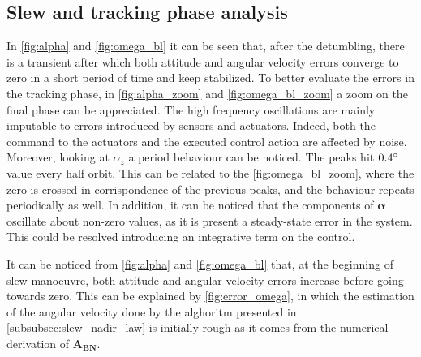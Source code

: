 \subsection{Slew and tracking phase analysis}
\label{subsec:slew_analysis}



In \autoref{fig:alpha} and \autoref{fig:omega_bl} it can be seen that, after the detumbling, there is a transient after which both attitude and angular velocity errors converge to zero in a short period of time and keep stabilized.
To better evaluate the errors in the tracking phase, in \autoref{fig:alpha_zoom} and \autoref{fig:omega_bl_zoom} a zoom on the final phase can be appreciated. The high frequency oscillations are mainly imputable to errors introduced by sensors and actuators. Indeed, both the command to the actuators and the executed control action are affected by noise.
Moreover, looking at $\alpha_z$ a period behaviour can be noticed. The peaks hit $0.4 \degree$ value every half orbit. This can be related to the \autoref{fig:omega_bl_zoom}, where the zero is crossed in corrispondence of the previous peaks, and the behaviour repeats periodically as well.
In addition, it can be noticed that the components of $\boldsymbol{\alpha}$ oscillate about non-zero values, as it is present a steady-state error in the system. This could be resolved introducing an integrative term on the control.

It can be noticed from \autoref{fig:alpha} and \autoref{fig:omega_bl} that, at the beginning of slew manoeuvre, both attitude and angular velocity errors increase before going towards zero. This can be explained by \autoref{fig:error_omega}, in which the estimation of the angular velocity done by the alghoritm presented in \autoref{subsubsec:slew_nadir_law} is initially rough as it comes from the numerical derivation of $\boldsymbol{A_{BN}}$.


